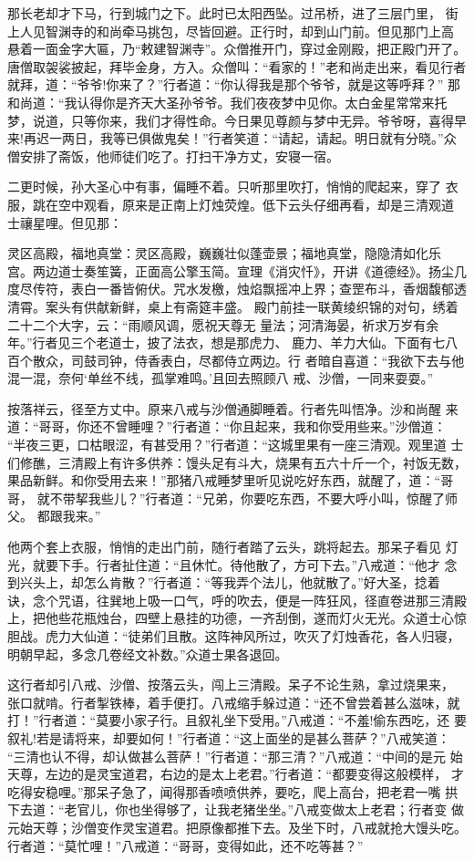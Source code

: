 那长老却才下马，行到城门之下。此时已太阳西坠。过吊桥，进了三层门里，
街上人见智渊寺的和尚牵马挑包，尽皆回避。正行时，却到山门前。但见那门上高
悬着一面金字大匾，乃“敕建智渊寺”。众僧推开门，穿过金刚殿，把正殿门开了。
唐僧取袈裟披起，拜毕金身，方入。众僧叫：“看家的！”老和尚走出来，看见行者
就拜，道：“爷爷!你来了？”行者道：“你认得我是那个爷爷，就是这等呼拜？”
那和尚道：“我认得你是齐天大圣孙爷爷。我们夜夜梦中见你。太白金星常常来托
梦，说道，只等你来，我们才得性命。今日果见尊颜与梦中无异。爷爷呀，喜得早
来!再迟一两日，我等已俱做鬼矣！”行者笑道：“请起，请起。明日就有分晓。”众
僧安排了斋饭，他师徒们吃了。打扫干净方丈，安寝一宿。

二更时候，孙大圣心中有事，偏睡不着。只听那里吹打，悄悄的爬起来，穿了
衣服，跳在空中观看，原来是正南上灯烛荧煌。低下云头仔细再看，却是三清观道
士禳星哩。但见那：

灵区高殿，福地真堂：灵区高殿，巍巍壮似蓬壶景；福地真堂，隐隐清如化乐
宫。两边道士奏笙簧，正面高公擎玉简。宣理《消灾忏》，开讲《道德经》。扬尘几
度尽传符，表白一番皆俯伏。咒水发檄，烛焰飘摇冲上界；查罡布斗，香烟馥郁透
清霄。案头有供献新鲜，桌上有斋筵丰盛。
殿门前挂一联黄绫织锦的对句，绣着二十二个大字，云：“雨顺风调，愿祝天尊无
量法；河清海晏，祈求万岁有余年。”行者见三个老道士，披了法衣，想是那虎力、
鹿力、羊力大仙。下面有七八百个散众，司鼓司钟，侍香表白，尽都侍立两边。行
者暗自喜道：“我欲下去与他混一混，奈何‘单丝不线，孤掌难鸣。’且回去照顾八
戒、沙僧，一同来耍耍。”

按落祥云，径至方丈中。原来八戒与沙僧通脚睡着。行者先叫悟净。沙和尚醒
来道：“哥哥，你还不曾睡哩？”行者道：“你且起来，我和你受用些来。”沙僧道：
“半夜三更，口枯眼涩，有甚受用？”行者道：“这城里果有一座三清观。观里道
士们修醮，三清殿上有许多供养：馒头足有斗大，烧果有五六十斤一个，衬饭无数，
果品新鲜。和你受用去来！”那猪八戒睡梦里听见说吃好东西，就醒了，道：“哥哥，
就不带挈我些儿？”行者道：“兄弟，你要吃东西，不要大呼小叫，惊醒了师父。
都跟我来。”

他两个套上衣服，悄悄的走出门前，随行者踏了云头，跳将起去。那呆子看见
灯光，就要下手。行者扯住道：“且休忙。待他散了，方可下去。”八戒道：“他才
念到兴头上，却怎么肯散？”行者道：“等我弄个法儿，他就散了。”好大圣，捻着
诀，念个咒语，往巽地上吸一口气，呼的吹去，便是一阵狂风，径直卷进那三清殿
上，把他些花瓶烛台，四壁上悬挂的功德，一齐刮倒，遂而灯火无光。众道士心惊
胆战。虎力大仙道：“徒弟们且散。这阵神风所过，吹灭了灯烛香花，各人归寝，
明朝早起，多念几卷经文补数。”众道士果各退回。

这行者却引八戒、沙僧、按落云头，闯上三清殿。呆子不论生熟，拿过烧果来，
张口就啃。行者掣铁棒，着手便打。八戒缩手躲过道：“还不曾尝着甚么滋味，就
打！”行者道：“莫要小家子行。且叙礼坐下受用。”八戒道：“不羞!偷东西吃，还
要叙礼!若是请将来，却要如何！”行者道：“这上面坐的是甚么菩萨？”八戒笑道：
“三清也认不得，却认做甚么菩萨！”行者道：“那三清？”八戒道：“中间的是元
始天尊，左边的是灵宝道君，右边的是太上老君。”行者道：“都要变得这般模样，
才吃得安稳哩。”那呆子急了，闻得那香喷喷供养，要吃，爬上高台，把老君一嘴
拱下去道：“老官儿，你也坐得够了，让我老猪坐坐。”八戒变做太上老君；行者变
做元始天尊；沙僧变作灵宝道君。把原像都推下去。及坐下时，八戒就抢大馒头吃。
行者道：“莫忙哩！”八戒道：“哥哥，变得如此，还不吃等甚？”

